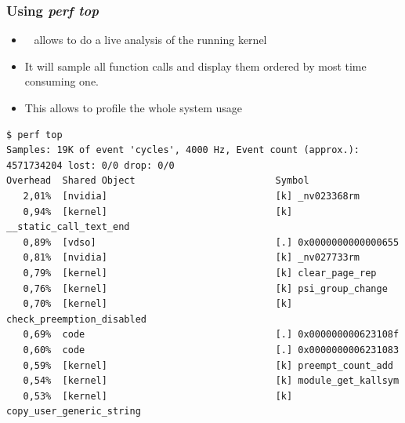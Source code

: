\begin{frame}[fragile]
  \frametitle{Using {\em perf top} }
  \begin{itemize}
    \item   allows to do a live analysis of the running kernel
    \item It will sample all function calls and display them ordered by most
          time consuming one.
    \item This allows to profile the whole system usage
  \end{itemize}

  \begin{block}{}
    \begin{verbatim}
$ perf top
Samples: 19K of event 'cycles', 4000 Hz, Event count (approx.): 4571734204 lost: 0/0 drop: 0/0
Overhead  Shared Object                         Symbol
   2,01%  [nvidia]                              [k] _nv023368rm
   0,94%  [kernel]                              [k] __static_call_text_end
   0,89%  [vdso]                                [.] 0x0000000000000655
   0,81%  [nvidia]                              [k] _nv027733rm
   0,79%  [kernel]                              [k] clear_page_rep
   0,76%  [kernel]                              [k] psi_group_change
   0,70%  [kernel]                              [k] check_preemption_disabled
   0,69%  code                                  [.] 0x000000000623108f
   0,60%  code                                  [.] 0x0000000006231083
   0,59%  [kernel]                              [k] preempt_count_add
   0,54%  [kernel]                              [k] module_get_kallsym
   0,53%  [kernel]                              [k] copy_user_generic_string
    \end{verbatim}
  \end{block}
\end{frame}

